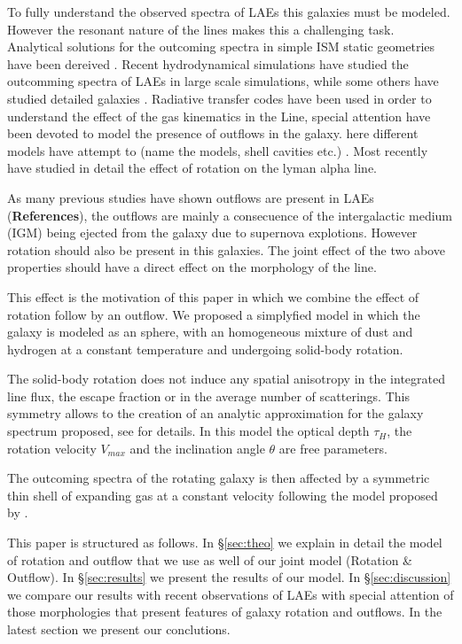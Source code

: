 \documentclass{latex/emulateapj}
\begin{document}
To fully understand the observed spectra of LAEs this galaxies must be modeled.
However the resonant nature of the lines makes this a challenging task. 
Analytical solutions for the outcoming spectra in simple ISM static geometries have been dereived
\cite{Adams72, Harrington73, Neufeld90, Dijkstra06}. Recent hydrodynamical simulations have studied the outcomming spectra of LAEs
in large scale simulations, while some others have studied detailed galaxies \citep{Verhamme12}. 
Radiative transfer codes \citep{Laursen09, Verhamme06, CLARA}have been used in order to understand the effect of the 
gas kinematics in the Line, special attention have been devoted to model the presence 
of outflows in the galaxy. here different models have attempt to (name the models, shell cavities etc.)
\citep{Behrens2014}
. Most recently \cite{Garavito14} have studied in detail the effect 
of rotation on the lyman alpha line.

As many previous studies have shown outflows are present in LAEs (\textbf{References}),
the outflows are mainly a consecuence of the intergalactic medium (IGM) being ejected 
from the galaxy due to supernova explotions.
However rotation should also be present in this galaxies. The joint effect of the two 
above properties should have a direct effect on the morphology of the \lya line.

This effect is the motivation of this paper in which we combine the effect of rotation 
follow by an outflow. We proposed a simplyfied model in which the galaxy is modeled
as an sphere, with an homogeneous mixture of dust and hydrogen at a constant temperature
and undergoing solid-body rotation.  

The solid-body rotation does not induce any spatial anisotropy in the integrated line flux, 
the escape fraction or in the average number of scatterings. This symmetry allows 
to the creation of an analytic approximation for the galaxy spectrum 
proposed, see \cite{Garavito14} for details. In this model the optical depth $\tau_{H}$, the 
rotation velocity $V_{max}$ and the inclination angle $\theta$ are free parameters.
 
The outcoming spectra of the rotating galaxy is then affected by a symmetric thin shell of expanding
gas at a constant velocity following the model proposed by \cite{2014arXiv1404.2958V, Orsi12}.  

This paper is structured as follows. In \S \ref{sec:theo} we explain in detail the model of rotation
and outflow that we use as well of our joint model (Rotation \& Outflow). In \S \ref{sec:results} we present
the results of our model. In \S \ref{sec:discussion} we compare our results with 
recent observations of LAEs with special attention of those morphologies that present
features of galaxy rotation and outflows. In the latest section we present our 
conclutions.
\end{document}
